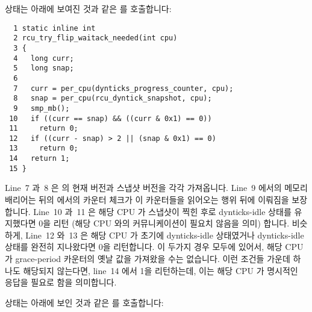  상태는 아래에 보여진 것과 같은
 를 호출합니다:
\iffalse

The \co{rcu_try_flip_waitack_state()} state invokes
\co{rcu_try_flip_waitack_needed()}, shown below:
\fi

{ \scriptsize
\begin{verbatim}
  1 static inline int
  2 rcu_try_flip_waitack_needed(int cpu)
  3 {
  4   long curr;
  5   long snap;
  6
  7   curr = per_cpu(dynticks_progress_counter, cpu);
  8   snap = per_cpu(rcu_dyntick_snapshot, cpu);
  9   smp_mb();
 10   if ((curr == snap) && ((curr & 0x1) == 0))
 11     return 0;
 12   if ((curr - snap) > 2 || (snap & 0x1) == 0)
 13     return 0;
 14   return 1;
 15 }
\end{verbatim}
}

Line~7 과~8 은  의 현재 버전과 스냅샷 버전을 각각
가져옵니다.
Line~9 에서의 메모리 배리어는 뒤의  에서의
카운터 체크가 이 카운터들을 읽어오는 행위 뒤에 이뤄짐을 보장합니다.
Line~10 과~11 은 해당 CPU 가 스냅샷이 찍힌 후로 dynticks-idle 상태를 유지했다면
0을 리턴 (해당 CPU 와의 커뮤니케이션이 필요치 않음을 의미) 합니다.
비슷하게, Line~12 와~13 은 해당 CPU 가 초기에 dynticks-idle 상태였거나
dynticks-idle 상태를 완전히 지나왔다면 0을 리턴합니다.
이 두가지 경우 모두에 있어서, 해당 CPU 가 grace-period 카운터의 옛날 값을
가져왔을 수는 없습니다.
이런 조건들 가운데 하나도 해당되지 않는다면, line~14 에서 1을 리턴하는데, 이는
해당 CPU 가 명시적인 응답을 필요로 함을 의미합니다.
\iffalse

Lines~7 and~8 pick up current and snapshot versions of
\co{dynticks_progress_counter}, respectively.
The memory barrier on line~9 ensures that the counter checks
in the later \co{rcu_try_flip_waitzero_state()} follow
the fetches of these counters.
Lines~10 and~11 return zero (meaning no communication with the
specified CPU is required) if that CPU has remained in dynticks-idle
state since the time that the snapshot was taken.
Similarly, lines~12 and~13 return zero if that CPU was initially
in dynticks-idle state or if it has completely passed through a
dynticks-idle state.
In both these cases, there is no way that that CPU could have retained
the old value of the grace-period counter.
If neither of these conditions hold, line~14 returns one, meaning
that the CPU needs to explicitly respond.
\fi

 상태는 아래에 보인 것과 같은
 를 호출합니다:
\iffalse

